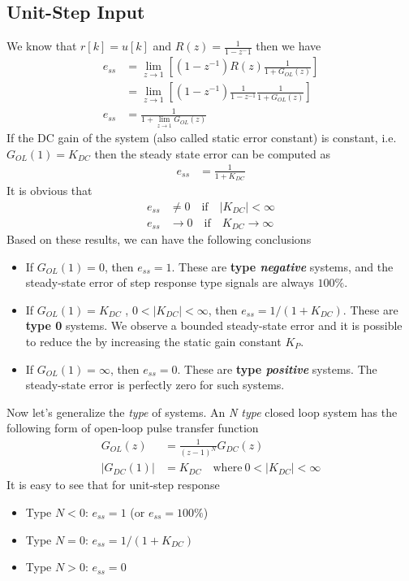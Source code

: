 \documentclass[twoside]{article}
\begin{document}
\subsection*{Unit-Step Input}

We know that $r[k] = u[k]$ and $R(z) = \frac{1}{1 - z^-1}$ then 
we have
%
%
\begin{align*}
e_{ss} &= \lim_{z \to 1} \left[ \left(1 - z^{-1} \right) R(z) \frac{1}{1
         + G_{OL} (z) } \right]
\\
&= \lim_{z \to 1} \left[ \left(1 - z^{-1} \right) \frac{1}{1-z^{-1}} \frac{1}{1
         + G_{OL} (z) } \right]
\\
e_{ss} &= \frac{1}{1 + \lim_{z \to 1} G_{OL} (z) }
\end{align*}
%
If the DC gain of the system (also called static error constant) is
constant, i.e. $G_{OL}(1) = K_{DC}$ then the steady state error can be
computed as
%
\begin{align*}
e_{ss} &= \frac{1}{1 + K_{DC}}
\end{align*}
%
It is obvious that 
%
\begin{align*}
e_{ss} &\neq 0 \quad \mathrm{if} \quad |K_{DC}| < \infty
\\
e_{ss} &\to 0 \quad \mathrm{if} \quad K_{DC} \to \infty
\end{align*}
%
Based on these results, we can have the following conclusions
%
\begin{itemize}
\item If $G_{OL} (1) = 0$, then $e_{ss} = 1$. These are \textbf{type
  \textit{negative}} systems, and the steady-state error of step 
response type signals are always $100 \%$.
\item If $G_{OL} (1) = K_{DC}$ , $0 < | K_{DC} | < \infty$, then $e_{ss} =
  1/(1 + K_{DC})$. These are \textbf{type 0} systems. We observe a
  bounded steady-state error and it is possible to reduce the by increasing the static gain
constant $K_P$. 
\item  If $G_{OL} (1) = \infty$, then $e_{ss} = 0$. These are
  \textbf{type \textit{positive}} systems. The steady-state error
  is perfectly zero for such systems.
\end{itemize}

Now let's generalize the \textit{type} of systems. An \textit{N type}
closed loop system has the following form of open-loop pulse transfer 
function
%
\begin{align*}
G_{OL}(z) &= \frac{1}{(z-1)^N} G_{DC}(z) \\
| G_{DC}(1) | &= K_{DC} \quad \mathrm{where} \ 0 < | K_{DC} | < \infty
\end{align*}
% 
It is easy to see that for unit-step response
%
\begin{itemize}
\item Type $N < 0$: $e_{ss} = 1$ (or $e_{ss} =100 \%$)
\item Type $N = 0$: $e_{ss} =  1/(1 + K_{DC})$
\item Type $N > 0$: $e_{ss} = 0$
\end{itemize}
\end{document}
